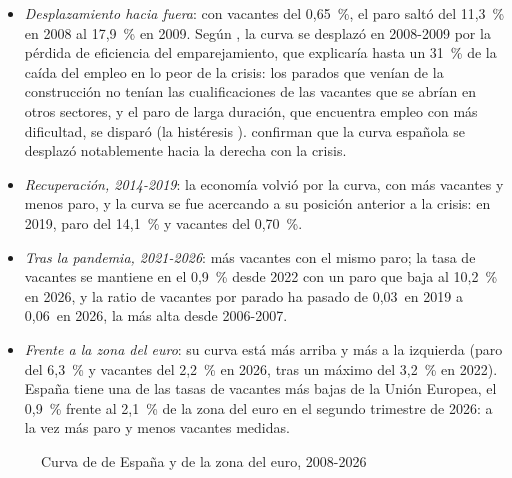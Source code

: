 \documentclass[11pt]{article}
\begin{document}
\begin{itemize}
\begin{itemize}
  \item \emph{Desplazamiento hacia fuera}: con vacantes del 0,65~\%, el paro saltó del 11,3~\% en 2008 al 17,9~\% en 2009\nocite{Eurostat2026jvs,Eurostat2026une}. Según \textcite{BoscaEtAl2017Beveridge}, la curva se desplazó en 2008-2009 por la pérdida de eficiencia del emparejamiento, que explicaría hasta un 31~\% de la caída del empleo en lo peor de la crisis: los parados que venían de la construcción no tenían las cualificaciones de las vacantes que se abrían en otros sectores, y el paro de larga duración, que encuentra empleo con más dificultad, se disparó (la histéresis ). \textcite{VillaverdeMazaHierro2015} confirman que la curva española se desplazó notablemente hacia la derecha con la crisis.
  \item \emph{Recuperación, 2014-2019}: la economía volvió por la curva, con más vacantes y menos paro, y la curva se fue acercando a su posición anterior a la crisis\nocite{BoscaEtAl2017Beveridge}: en 2019, paro del 14,1~\% y vacantes del 0,70~\%.
  \item \emph{Tras la pandemia, 2021-2026}: más vacantes con el mismo paro; la tasa de vacantes se mantiene en el 0,9~\% desde 2022 con un paro que baja al 10,2~\% en 2026, y la ratio de vacantes por parado ha pasado de 0,03~en 2019 a 0,06~en 2026, la más alta desde 2006-2007\nocite{Eurostat2026jvs,Eurostat2026une,INE2026EPAParados}.
  \item \emph{Frente a la zona del euro}: su curva está más arriba y más a la izquierda (paro del 6,3~\% y vacantes del 2,2~\% en 2026, tras un máximo del 3,2~\% en 2022). España tiene una de las tasas de vacantes más bajas de la Unión Europea, el 0,9~\% frente al 2,1~\% de la zona del euro en el segundo trimestre de 2026\nocite{Eurostat2026jvs}: a la vez más paro y menos vacantes medidas.
  \end{itemize}
\end{itemize}

\begin{figure}[H]
\centering
\caption{Curva de  de España y de la zona del euro, 2008-2026}\label{fig:beveridge-espana}
\end{figure}
\end{document}
